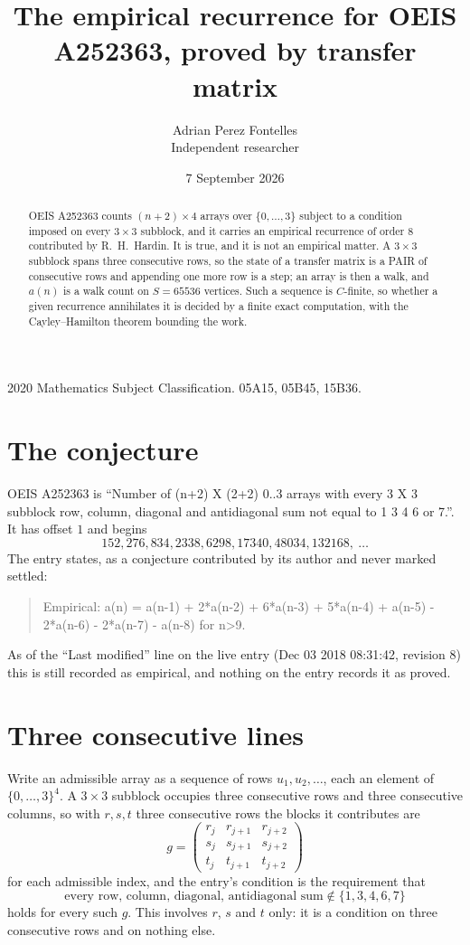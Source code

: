 \documentclass[11pt,a4paper]{article}
\title{The empirical recurrence for OEIS A252363, proved by transfer matrix}
\author{Adrian Perez Fontelles\\ \small Independent researcher}
\date{7 September 2026}
\theoremstyle{plain}
\theoremstyle{definition}
\begin{document}
\maketitle

\begin{abstract}
OEIS A252363 counts $(n+2)\times4$ arrays over $\{0,\dots,3\}$ subject to a condition imposed on
every $3\times3$ subblock, and it carries an empirical recurrence of order $8$
contributed by R.~H.~Hardin. It is true, and it is not an empirical matter. A $3\times3$
subblock spans three consecutive rows, so the state of a transfer matrix is a PAIR of
consecutive rows and appending one more row is a step; an array is then a walk, and
$a(n)$ is a walk count on $S=65536$ vertices. Such a sequence is $C$-finite, so whether a given
recurrence annihilates it is decided by a finite exact computation, with the Cayley--Hamilton
theorem bounding the work.
\end{abstract}

\noindent\small 2020 Mathematics Subject Classification. 05A15, 05B45, 15B36.\normalsize

\section{The conjecture}

OEIS A252363 is ``Number of (n+2) X (2+2) 0..3 arrays with every 3 X 3 subblock row, column, diagonal and antidiagonal sum not equal to 1 3 4 6 or 7.''. It has offset $1$ and begins
\[
152, 276, 834, 2338, 6298, 17340, 48034, 132168,\ \dots
\]
The entry states, as a conjecture contributed by its author and never marked settled:
\begin{quote}
Empirical: a(n) = a(n-1) + 2*a(n-2) + 6*a(n-3) + 5*a(n-4) + a(n-5) - 2*a(n-6) - 2*a(n-7) - a(n-8) for n>9.
\end{quote}
As of the ``Last modified'' line on the live entry (Dec 03 2018 08:31:42, revision 8) this is still
recorded as empirical, and nothing on the entry records it as proved.

\section{Three consecutive lines}

Write an admissible array as a sequence of rows $u_1,u_2,\dots$, each an element of
$\{0,\dots,3\}^{4}$. A $3\times3$ subblock occupies three consecutive rows and
three consecutive columns, so with $r,s,t$ three consecutive rows the blocks it
contributes are
\[
g=\begin{pmatrix}r_j&r_{j+1}&r_{j+2}\\ s_j&s_{j+1}&s_{j+2}\\ t_j&t_{j+1}&t_{j+2}\end{pmatrix}
\]
for each admissible index, and the entry's condition is the requirement that
\[
\text{every row, column, diagonal, antidiagonal sum} \notin \{1,3,4,6,7\}
\]
holds for every such $g$. This involves $r$, $s$ and $t$ only: it is a condition on
three consecutive rows and on nothing else.
\end{document}
